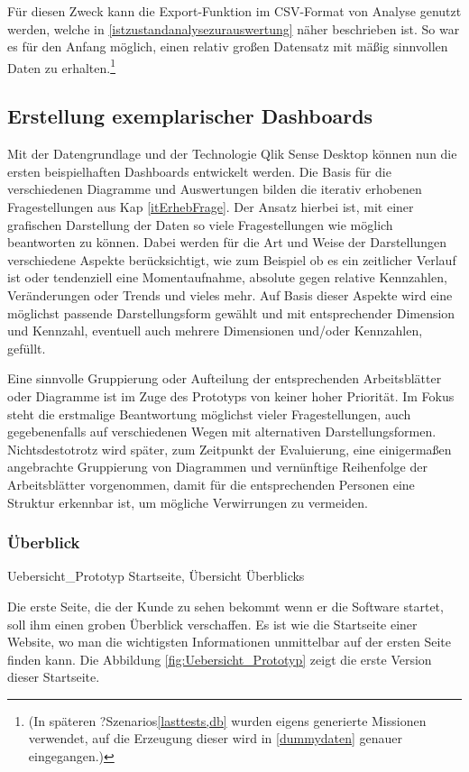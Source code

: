 Für diesen Zweck kann die Export-Funktion im CSV-Format von Analyse genutzt werden, welche in  \ref{istzustandanalysezurauswertung} näher beschrieben ist. 
So war es für den Anfang möglich, einen relativ großen Datensatz mit mäßig sinnvollen Daten zu erhalten.\footnote{(In späteren ?Szenarios\ref{lasttests,db} wurden eigens generierte Missionen verwendet, auf die Erzeugung dieser wird in \ref{dummydaten} genauer eingegangen.)}

\subsection{Erstellung exemplarischer Dashboards} 
Mit der Datengrundlage und der Technologie Qlik Sense Desktop können nun die ersten beispielhaften Dashboards entwickelt werden.
Die Basis für die verschiedenen Diagramme und Auswertungen bilden die iterativ erhobenen Fragestellungen aus Kap \ref{itErhebFrage}. 
Der Ansatz hierbei ist, mit einer grafischen Darstellung der Daten so viele Fragestellungen wie möglich beantworten zu können.
Dabei werden für die Art und Weise der Darstellungen verschiedene Aspekte berücksichtigt, wie zum Beispiel ob es ein zeitlicher Verlauf ist oder tendenziell eine Momentaufnahme, absolute gegen relative Kennzahlen, Veränderungen oder Trends und vieles mehr.
Auf Basis dieser Aspekte wird eine möglichst passende Darstellungsform gewählt und mit entsprechender Dimension und Kennzahl, eventuell auch mehrere Dimensionen und/oder Kennzahlen, gefüllt.

Eine sinnvolle Gruppierung oder Aufteilung der entsprechenden Arbeitsblätter oder Diagramme ist im Zuge des Prototyps von keiner hoher Priorität. 
Im Fokus steht die erstmalige Beantwortung möglichst vieler Fragestellungen, auch gegebenenfalls auf verschiedenen Wegen mit alternativen Darstellungsformen.
Nichtsdestotrotz wird später, zum Zeitpunkt der Evaluierung, eine einigermaßen angebrachte Gruppierung von Diagrammen und vernünftige Reihenfolge der Arbeitsblätter vorgenommen, damit für die entsprechenden Personen eine Struktur erkennbar ist, um mögliche Verwirrungen zu vermeiden.

\subsubsection{Überblick}
\bildbreit
{Uebersicht_Prototyp}
{Startseite, Übersicht}
{Überblicks}

Die erste Seite, die der Kunde zu sehen bekommt wenn er die Software startet, soll ihm einen groben Überblick verschaffen. 
Es ist wie die Startseite einer Website, wo man die wichtigsten Informationen unmittelbar auf der ersten Seite finden kann.
Die Abbildung \ref{fig:Uebersicht_Prototyp} zeigt die erste Version dieser Startseite.

